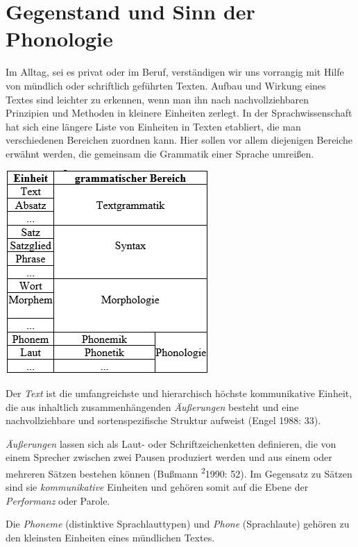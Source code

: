 \documentclass[
]{article}
\begin{document}
\hypertarget{gegenstand-und-sinn-der-phonologie}{%
\section{Gegenstand und Sinn der Phonologie}\label{gegenstand-und-sinn-der-phonologie}}

Im Alltag, sei es privat oder im Beruf, verständigen wir uns vorrangig
mit Hilfe von mündlich oder schriftlich geführten Texten. Aufbau und
Wirkung eines Textes sind leichter zu erkennen, wenn man ihn nach
nachvollziehbaren Prinzipien und Methoden in kleinere Einheiten zerlegt.
In der Sprachwissenschaft hat sich eine längere Liste von Einheiten in
Texten etabliert, die man verschiedenen Bereichen zuordnen kann. Hier
sollen vor allem diejenigen Bereiche erwähnt werden, die gemeinsam die
Grammatik einer Sprache umreißen.

\includegraphics[width=0.6\linewidth]{pictures/grammatische_bereiche}

Der \emph{Text} ist die umfangreichste und hierarchisch höchste kommunikative
Einheit, die aus inhaltlich zusammenhängenden \emph{Äußerungen} besteht und
eine nachvollziehbare und sortenspezifische Struktur aufweist (Engel
1988: 33).

\emph{Äußerungen} lassen sich als Laut- oder Schriftzeichenketten definieren,
die von einem Sprecher zwischen zwei Pausen produziert werden und aus
einem oder mehreren Sätzen bestehen können (Bußmann \textsuperscript{2}1990: 52). Im
Gegensatz zu Sätzen sind sie \emph{kommunikative} Einheiten und gehören somit
auf die Ebene der \emph{Performanz} oder Parole.

Die \emph{Phoneme} (distinktive Sprachlauttypen) und \emph{Phone} (Sprachlaute)
gehören zu den kleinsten Einheiten eines mündlichen Textes.
\end{document}

